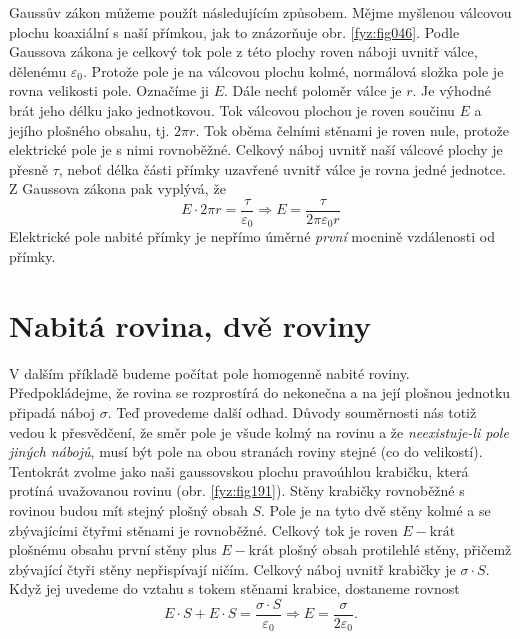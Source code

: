 
  Gaussův zákon můžeme použít následujícím způsobem. Mějme myšlenou válcovou plochu koaxiální s naší
  přímkou, jak to znázorňuje obr. \ref{fyz:fig046}. Podle Gaussova zákona je celkový tok pole z této
  plochy roven náboji uvnitř válce, dělenému \(\varepsilon_0\). Protože pole je na válcovou plochu
  kolmé, normálová složka pole je rovna velikosti pole. Označíme ji \(E\). Dále nechť poloměr válce
  je \(r\). Je výhodné brát jeho délku jako jednotkovou. Tok válcovou plochou je roven součinu \(E\)
  a jejího plošného obsahu, tj. \(2\pi r\). Tok oběma čelními stěnami je roven nule, protože
  elektrické pole je s nimi rovnoběžné. Celkový náboj uvnitř naší válcové plochy je přesně \(\tau\),
  neboť délka části přímky uzavřené uvnitř válce je rovna jedné jednotce. Z Gaussova zákona pak
  vyplývá, že
  \begin{equation}\label{fyz:eq_fey_elstat_gauss02}
    E\cdot2\pi r = \frac{\tau}{\varepsilon_0} \Rightarrow E = \frac{\tau}{2\pi\varepsilon_0 r}
  \end{equation}
  Elektrické pole nabité přímky je nepřímo úměrné \emph{první} mocnině vzdálenosti od přímky.
  
     

\section{Nabitá rovina, dvě roviny}\label{fyz:IIchapVsecV}
  V dalším příkladě budeme počítat pole homogenně nabité roviny. Předpokládejme, že rovina se
  rozprostírá do nekonečna a na její plošnou jednotku připadá náboj \(\sigma\). Teď provedeme další
  odhad. Důvody souměrnosti nás totiž vedou k přesvědčení, že směr pole je všude kolmý na rovinu a
  že \emph{neexistuje-li pole jiných nábojů}, musí být pole na obou stranách roviny stejné (co do
  velikostí). Tentokrát zvolme jako naši gaussovskou plochu pravoúhlou krabičku, která protíná
  uvažovanou rovinu (obr. \ref{fyz:fig191}). Stěny krabičky rovnoběžné s rovinou budou mít stejný
  plošný obsah \(S\). Pole je na tyto dvě stěny kolmé a se zbývajícími čtyřmi stěnami je rovnoběžné.
  Celkový tok je roven \(E-\text{krát}\) plošnému obsahu první stěny plus \(E-\text{krát}\) plošný
  obsah protilehlé stěny, přičemž zbývající čtyři stěny nepřispívají ničím. Celkový náboj uvnitř
  krabičky je \(\sigma\cdot S\). Když jej uvedeme do vztahu s tokem stěnami krabice, dostaneme
  rovnost
  \begin{equation}\label{fyz:eq_fey_elstat_gauss03}
    E\cdot S + E\cdot S = \frac{\sigma\cdot S}{\varepsilon_0} \Rightarrow 
    E = \frac{\sigma}{2\varepsilon_0}.
  \end{equation}
  
